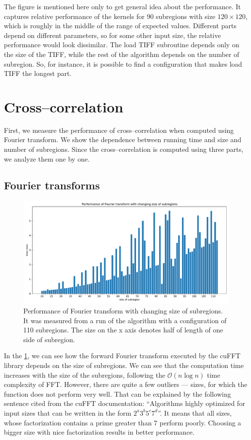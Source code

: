The figure is mentioned here only to get general idea about the performance. It captures relative performance of the kernels for 90 subregions with size $120 \times 120$, which is roughly in the middle of the range of expected values. Different parts depend on different parameters, so for some other input size, the relative performance would look dissimilar. The load TIFF subroutine depends only on the size of the TIFF, while the rest of the algorithm depends on the number of subregion. So, for instance, it is possible to find a configuration that makes load TIFF the longest part. 

\section{Cross--correlation}
First, we measure the performance of cross--correlation when computed using Fourier transform. We show the dependence between running time and size and number of subregions. Since the cross--correlation is computed using three parts, we analyze them one by one.


\subsection{Fourier transforms}
\begin{figure}
	\centering
	\includegraphics[width=\textwidth]{img/eval/Fourier-transform-size}
	\caption{Performance of Fourier transform with changing size of subregions. It was measured from a run of the algorithm with a configuration of 110 subregions. The size on the x axis denotes half of length of one side of subregion.}
	\label{Fourier-transform-size}
\end{figure}

In the \cref{Fourier-transform-size}, we can see how the forward Fourier transform executed by the cuFFT library depends on the size of subregions. We can see that the computation time increases with the size of the subregions, following the $\mathcal{O}(n \log n)$ time complexity of FFT. However, there are quite a few outliers --- sizes, for which the function does not perform very well. That can be explained by the following sentence cited from the cuFFT documentation: ``Algorithms highly optimized for input sizes that can be written in the form $2^a3^b5^c7^d$''. It means that all sizes, whose factorization contains a prime greater than 7 perform poorly. Choosing a bigger size with nice factorization results in better performance.

